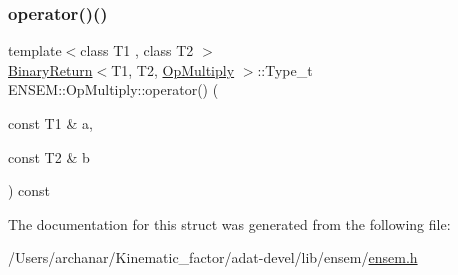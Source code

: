 \subsubsection{\texorpdfstring{operator()()}{operator()()}\hspace{0.1cm}{\footnotesize\ttfamily [3/3]}}
{\footnotesize\ttfamily template$<$class T1 , class T2 $>$ \\
\mbox{\hyperlink{structENSEM_1_1BinaryReturn}{Binary\+Return}}$<$T1, T2, \mbox{\hyperlink{structENSEM_1_1OpMultiply}{Op\+Multiply}} $>$\+::Type\+\_\+t E\+N\+S\+E\+M\+::\+Op\+Multiply\+::operator() (\begin{DoxyParamCaption}\item[{const T1 \&}]{a,  }\item[{const T2 \&}]{b }\end{DoxyParamCaption}) const\hspace{0.3cm}{\ttfamily [inline]}}



The documentation for this struct was generated from the following file\+:\begin{DoxyCompactItemize}
\item 
/\+Users/archanar/\+Kinematic\+\_\+factor/adat-\/devel/lib/ensem/\mbox{\hyperlink{adat-devel_2lib_2ensem_2ensem_8h}{ensem.\+h}}\end{DoxyCompactItemize}

